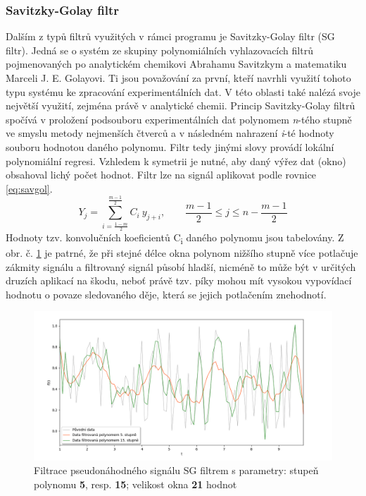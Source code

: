\documentclass[a4paper, 12pt]{article}
\begin{document}
\subsubsection{Savitzky-Golay filtr}
\label{sec:filtr2}
Dalším z typů filtrů využitých v rámci programu je Savitzky-Golay filtr (SG filtr). Jedná se o systém ze skupiny polynomiálních vyhlazovacích filtrů pojmenovaných po analytickém chemikovi Abrahamu Savitzkym a  matematiku Marceli J. E. Golayovi. \cite{SGF} Ti jsou považování za první, kteří navrhli využití tohoto typu systému ke zpracování experimentálních dat. V této oblasti také nalézá svoje největší využití, zejména právě v analytické chemii. Princip Savitzky-Golay filtrů spočívá v proložení podsouboru experimentálních dat polynomem \textit{n}-tého stupně ve smyslu metody nejmenších čtverců a v následném nahrazení \textit{i}-té hodnoty souboru hodnotou daného polynomu. Filtr tedy jinými slovy provádí lokální polynomiální regresi. Vzhledem k symetrii je nutné, aby daný výřez dat (okno) obsahoval lichý počet hodnot.
Filtr lze na signál aplikovat podle rovnice \ref{eq:savgol}.
\begin{equation}
     Y_{j} = \sum_{i=\frac{1-m}{2}}^{\frac{m-1}{2}} C_{i}\ y_{j+i},\qquad \frac{m-1}{2} \leq j \leq n-\frac{m-1}{2}
\label{eq:savgol}
\end{equation}
Hodnoty tzv. konvolučních koeficientů C\textsubscript{i} daného polynomu jsou tabelovány.
Z obr. č. \ref{fig:theo_savitzkygol} je patrné, že při stejné délce okna polynom nižšího stupně více potlačuje zákmity signálu a filtrovaný signál působí hladší, nicméně to může být v určitých druzích aplikací na škodu, neboť právě tzv. píky mohou mít vysokou vypovídací hodnotu o povaze sledovaného děje, která se jejich potlačením znehodnotí.

\begin{figure}[hbt!]
 \includegraphics[width=\linewidth]{savgol_.png}
 \caption{Filtrace pseudonáhodného signálu SG filtrem s parametry: stupeň polynomu \textbf{5}, resp. \textbf{15}; velikost okna \textbf{21} hodnot}
 \centering
 \label{fig:theo_savitzkygol}
\end{figure}
\end{document}
